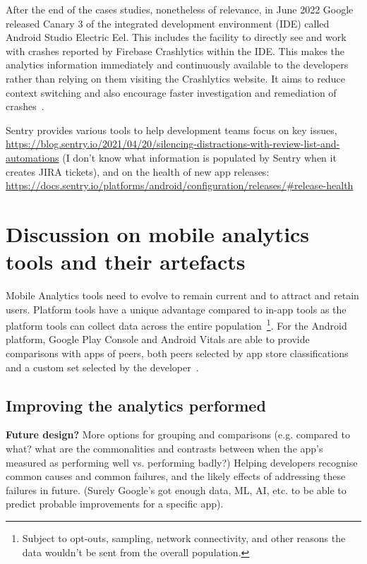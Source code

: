 After the end of the cases studies, nonetheless of relevance, in June 2022 Google released Canary 3 of the integrated development environment (IDE) called Android Studio Electric Eel. This includes the facility to directly see and work with crashes reported by Firebase Crashlytics within the IDE. This makes the analytics information immediately and continuously available to the developers rather than relying on them visiting the Crashlytics website. It aims to reduce context switching and also encourage faster investigation and remediation of crashes~\citep{android2022_firebase_crash_integration_into_android_studio_electric_eel}.


Sentry provides various tools to help development teams focus on key issues,  \url{https://blog.sentry.io/2021/04/20/silencing-distractions-with-review-list-and-automations} (I don't know what information is populated by Sentry when it creates JIRA tickets),  and on the health of new app releases: \url{https://docs.sentry.io/platforms/android/configuration/releases/#release-health}


\section{Discussion on mobile analytics tools and their artefacts}
Mobile Analytics tools need to evolve to remain current and to attract and retain users. Platform tools have a unique advantage compared to in-app tools as the platform tools can collect data across the entire population~\footnote{Subject to opt-outs, sampling, network connectivity, and other reasons the data wouldn't be sent from the overall population.}. For the Android platform, Google Play Console and Android Vitals are able to provide comparisons with apps of peers, both peers selected by app store classifications~\citep{androiddevelopersblog2021_gpc_powers_better_strategic_decisions_etc} and a custom set selected by the developer~\citep{play_console_help_compare_your_apps_android_vitals_and_ratings_with_peer_groups}. 

\subsection{Improving the analytics performed}
\textbf{Future design?} More options for grouping and comparisons (e.g. compared to what? what are the commonalities and contrasts between when the app's measured as performing well vs. performing badly?) Helping developers recognise common causes and common failures, and the likely effects of addressing these failures in future. (Surely Google's got enough data, ML, AI, etc. to be able to predict probable improvements for a specific app).


